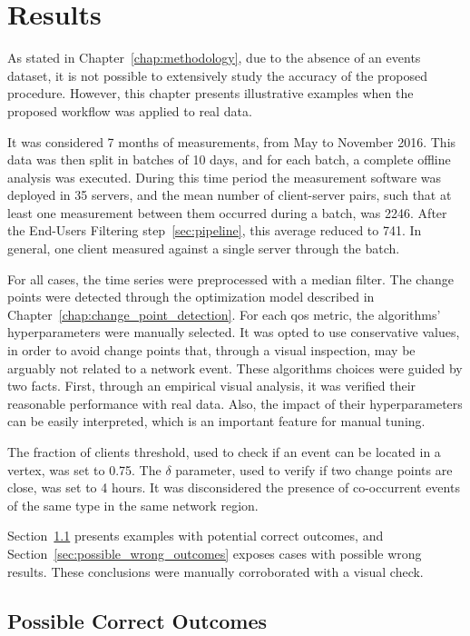 \chapter{Results}
\label{chap:results}

As stated in Chapter~\ref{chap:methodology}, due to the absence of an events
dataset, it is not possible to extensively study the accuracy of the proposed
procedure.
However, this chapter presents illustrative examples when the proposed workflow
was applied to real data.

It was considered 7 months of measurements, from May to November 2016.
This data was then split in batches of 10 days, and for each batch,
a complete offline analysis was executed.
During this time period the measurement software was deployed in 35 servers,
and the mean number of client-server
pairs, such that at least one measurement between them occurred during a batch,
was 2246.
After the End-Users Filtering step~\ref{sec:pipeline},
this average reduced to 741.
In general, one client measured against a single server through the batch.

For all cases, the time series were preprocessed with a median filter.
The change points were detected through the optimization model described in
Chapter~\ref{chap:change_point_detection}.
For each \gls*{qos} metric, the algorithms' hyperparameters were manually
selected.
It was opted to use conservative values, in order to avoid change points that,
through a visual inspection, may be arguably not related to a network event.
These algorithms choices were guided by two facts.
First, through an empirical visual analysis,
it was verified their reasonable performance with real data.
Also, the impact of their hyperparameters can be easily interpreted, which is
an important feature for manual tuning.

The fraction of clients threshold, used to check if an event can be
located in a vertex, was set to 0.75. The $\delta$ parameter, used to verify if
two change points are close, was set to 4 hours.
It was disconsidered the presence of co-occurrent events of the same type in the
same network region.

Section~\ref{sec:possible_correct_outcomes} presents examples with potential
correct outcomes, and Section~\ref{sec:possible_wrong_outcomes} exposes
cases with possible wrong results. These conclusions were manually corroborated
with a visual check.

\section{Possible Correct Outcomes}
\label{sec:possible_correct_outcomes}

